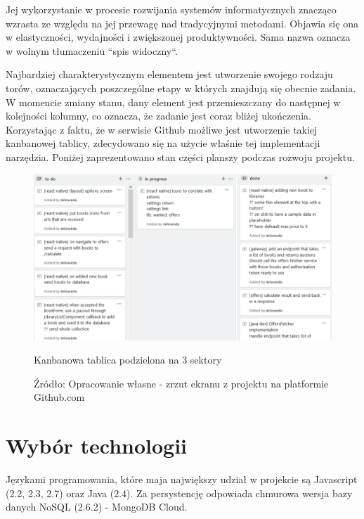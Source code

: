 \newpage
Jej wykorzystanie w procesie rozwijania systemów informatycznych znacząco wzrasta ze względu na jej przewagę nad tradycyjnymi metodami. Objawia się ona w elastyczności, wydajności i zwiększonej produktywności. Sama nazwa oznacza w wolnym tłumaczeniu ``spis widoczny``.~\cite{kanban}

Najbardziej charakterystycznym elementem jest utworzenie swojego rodzaju torów, oznaczających poszczególne etapy w których znajdują się obecnie zadania. W momencie zmiany stanu, dany element jest przemieszczany do następnej w kolejności kolumny, co oznacza, że zadanie jest coraz bliżej ukończenia.\newline
Korzystając z faktu, że w serwisie Github możliwe jest utworzenie takiej kanbanowej tablicy, zdecydowano się na użycie właśnie tej implementacji narzędzia. Poniżej zaprezentowano stan części planszy podczas rozwoju projektu.
\begin{figure}[H]
	\centering
	\includegraphics[width=\linewidth]{kanban.pdf}
	\caption{\centering Kanbanowa tablica podzielona na 3 sektory}
	\caption*{\centering Źródło: {Opracowanie własne - zrzut ekranu z projektu na platformie Github.com}}
\end{figure}

\newpage
\section{Wybór technologii}
Językami programowania, które maja największy udział w projekcie są Javascript (2.2, 2.3, 2.7) oraz Java (2.4).\newline
Za persystencję odpowiada chmurowa wersja bazy danych NoSQL (2.6.2) - MongoDB Cloud.

